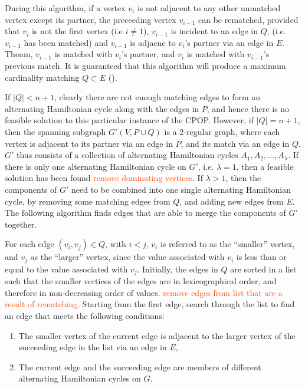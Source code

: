 \documentclass[oribibl]{llncs}
\begin{document}
During this algorithm, if a vertex $v_i$ is not adjacent to any other unmatched vertex except its partner, the preceeding vertex $v_{i-1}$ can be rematched, provided that $v_i$ is not the first vertex (i.e $i \neq 1$), $v_{i-1}$ is incident to an edge in $Q$, (i.e. $v_{i-1}$ has been matched) and $v_{i-1}$ is adjacne to $v_i$'s partner via an edge in $E$. Thenm, $v_{i-1}$ is matched with $v_i$'s partner, and $v_i$ is matched with $v_{i-1}$'s previous match. It is guaranteed that this algorithm will produce a maximum cardinality matching $Q \subset E$ (\citealp{becker2010}).

If $|Q| < n+1$, clearly there are not enough matching edges to form an alternating Hamiltonian cycle along with the edges in $P$, and hence there is no feasible solution to this particular instance of the CPOP. However, if $|Q| = n+1$, then the spanning subgraph $G'(V, P \cup Q)$ is a 2-regular graph, where each vertex is adjacent to its partner via an edge in $P$, and its match via an edge in $Q$. $G'$ thus consists of a collection of alternating Hamiltonian cycles $A_1, A_2, ..., A_{\lambda}$. If there is only one alternating Hamiltonian cycle on $G'$, i.e. $\lambda = 1$, then a feasible solution has been found \textcolor{OrangeRed}{remove dominating vertices}. If $\lambda > 1$, then the components of $G'$ need to be combined into one single alternating Hamiltonian cycle, by removing some matching edges from $Q$, and adding new edges from $E$. The following algorithm finds edges that are able to merge the components of $G'$ together.

For each edge $(v_i, v_j) \in Q$, with $i < j$, $v_i$ is referred to as the ``smaller'' vertex, and $v_j$ as the ``larger'' vertex, since the value associated with $v_i$ is less than or equal to the value associated with $v_j$. Initially, the edges in $Q$ are sorted in a list such that the smaller vertices of the edges are in lexicographical order, and therefore in non-decreasing order of values. \textcolor{OrangeRed}{remove edges from list that are a result of rematching}. Starting from the first edge, search through the list to find an edge that meets the following conditions:
\begin{enumerate}
	\item The smaller vertex of the current edge is adjacent to the larger vertex of the succeeding edge in the list via an edge in $E$,
	\item The current edge and the succeeding edge are members of different alternating Hamiltonian cycles on $G$.
\end{enumerate}
\end{document}
